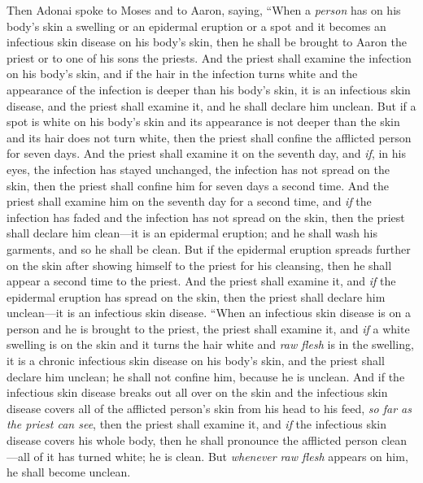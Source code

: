 \begin{biblechapter} %
 Then Adonai spoke to Moses and to Aaron, saying,
\verse “When a \textit{person} has on his body’s skin a swelling or an epidermal eruption or a spot and it becomes an infectious skin disease on his body’s skin, then he shall be brought to Aaron the priest or to one of his sons the priests.
\verse And the priest shall examine the infection on his body’s skin, and if the hair in the infection turns white and the appearance of the infection is deeper than his body’s skin, it is an infectious skin disease, and the priest shall examine it, and he shall declare him unclean.
\verse But if a spot is white on his body’s skin and its appearance is not deeper than the skin and its hair does not turn white, then the priest shall confine the afflicted person for seven days.
\verse And the priest shall examine it on the seventh day, and \textit{if}, in his eyes, the infection has stayed unchanged, the infection has not spread on the skin, then the priest shall confine him for seven days a second time.
\verse And the priest shall examine him on the seventh day for a second time, and \textit{if} the infection has faded and the infection has not spread on the skin, then the priest shall declare him clean—it is an epidermal eruption; and he shall wash his garments, and so he shall be clean.
\verse But if the epidermal eruption spreads further on the skin after showing himself to the priest for his cleansing, then he shall appear a second time to the priest.
\verse And the priest shall examine it, and \textit{if} the epidermal eruption has spread on the skin, then the priest shall declare him unclean—it is an infectious skin disease.
\verse “When an infectious skin disease is on a person and he is brought to the priest,
\verse the priest shall examine it, and \textit{if} a white swelling is on the skin and it turns the hair white and \textit{raw flesh} is in the swelling,
\verse it is a chronic infectious skin disease on his body’s skin, and the priest shall declare him unclean; he shall not confine him, because he is unclean.
\verse And if the infectious skin disease breaks out all over on the skin and the infectious skin disease covers all of the afflicted person’s skin from his head to his feed, \textit{so far as the priest can see},
\verse then the priest shall examine it, and \textit{if} the infectious skin disease covers his whole body, then he shall pronounce the afflicted person clean—all of it has turned white; he is clean.
\verse But \textit{whenever} \textit{raw flesh} appears on him, he shall become unclean.

\end{biblechapter}
